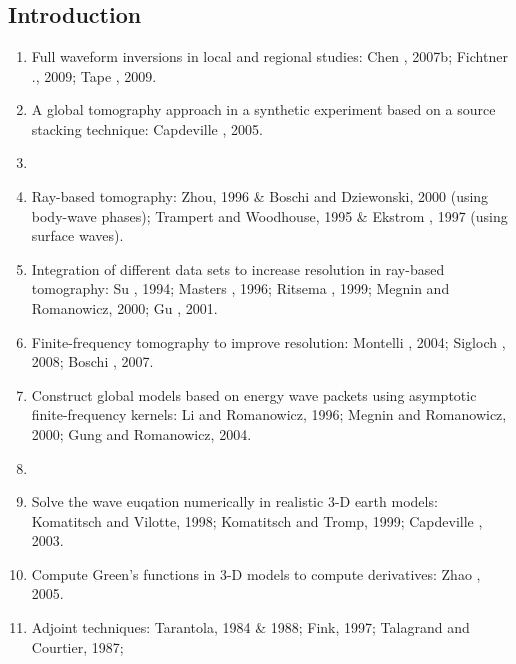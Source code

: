 \renewcommand{\pmk}{Bozdag\_2011\_GJI\_Misfit functions for FWI}
\renewcommand{\prf}{FWI/\pmk.pdf}
\renewcommand{\pti}{Misfit functions for full waveform inversion based on instantaneous phase
and envelope measurements}
\renewcommand{\pay}{Ebru Bozdag, Jeannot Trampert and Jeroen Tromp, 2011}
\renewcommand{\pjo}{Geophys. J. Int.}
\renewcommand{\pda}{2017/4/3 Mon.}

\section{\pinfo}
\subsection{Introduction}
\begin{enumerate}[\hspace{10mm}*]
  \item Full waveform inversions in local and regional studies:
    Chen \etal, 2007b; Fichtner \etal., 2009; Tape \etal, 2009.
  \item A global tomography approach in a synthetic experiment
    based on a source stacking technique: Capdeville \etal, 2005.
  \item \sline
  \item Ray-based tomography: Zhou, 1996 \& Boschi and Dziewonski, 2000 (using body-wave phases);
    Trampert and Woodhouse, 1995 \& Ekstrom \etal, 1997 (using surface waves).
  \item Integration of different data sets to increase resolution in ray-based tomography:
    Su \etal, 1994; Masters \etal, 1996; Ritsema \etal, 1999; Megnin and Romanowicz, 2000;
    Gu \etal, 2001.
  \item Finite-frequency tomography to improve resolution:
    Montelli \etal, 2004; Sigloch \etal, 2008; Boschi \etal, 2007.
  \item Construct global models based on energy wave packets
    using asymptotic finite-frequency kernels: Li and Romanowicz, 1996;
    Megnin and Romanowicz, 2000; Gung and Romanowicz, 2004.
  \item \sline
  \item Solve the wave euqation numerically in realistic 3-D earth models:
    Komatitsch and Vilotte, 1998; Komatitsch and Tromp, 1999; Capdeville \etal, 2003.
  \item Compute Green's functions in 3-D models to compute \Frechet derivatives:
    Zhao \etal, 2005.
  \item Adjoint techniques: Tarantola, 1984 \& 1988; Fink, 1997; Talagrand and Courtier, 1987;

\end{enumerate}
